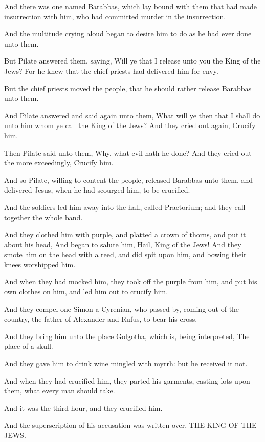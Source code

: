 \verse And there was one named Barabbas, which lay bound with them that had made insurrection with him, who had committed murder in the insurrection.

\verse And the multitude crying aloud began to desire him to do as he had ever done unto them.

\verse But Pilate answered them, saying, Will ye that I release unto you the King of the Jews?  \verse For he knew that the chief priests had delivered him for envy.

\verse But the chief priests moved the people, that he should rather release Barabbas unto them.

\verse And Pilate answered and said again unto them, What will ye then that I shall do unto him whom ye call the King of the Jews?  \verse And they cried out again, Crucify him.

\verse Then Pilate said unto them, Why, what evil hath he done? And they cried out the more exceedingly, Crucify him.

\verse And so Pilate, willing to content the people, released Barabbas unto them, and delivered Jesus, when he had scourged him, to be crucified.

\verse And the soldiers led him away into the hall, called Praetorium; and they call together the whole band.

\verse And they clothed him with purple, and platted a crown of thorns, and put it about his head, \verse And began to salute him, Hail, King of the Jews!  \verse And they smote him on the head with a reed, and did spit upon him, and bowing their knees worshipped him.

\verse And when they had mocked him, they took off the purple from him, and put his own clothes on him, and led him out to crucify him.

\verse And they compel one Simon a Cyrenian, who passed by, coming out of the country, the father of Alexander and Rufus, to bear his cross.

\verse And they bring him unto the place Golgotha, which is, being interpreted, The place of a skull.

\verse And they gave him to drink wine mingled with myrrh: but he received it not.

\verse And when they had crucified him, they parted his garments, casting lots upon them, what every man should take.

\verse And it was the third hour, and they crucified him.

\verse And the superscription of his accusation was written over, THE KING OF THE JEWS.

